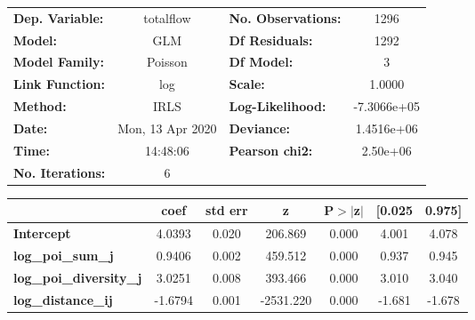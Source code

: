 \begin{center}
\begin{tabular}{lclc}
\toprule
\textbf{Dep. Variable:}         &    totalflow     & \textbf{  No. Observations:  } &      1296    \\
\textbf{Model:}                 &       GLM        & \textbf{  Df Residuals:      } &      1292    \\
\textbf{Model Family:}          &     Poisson      & \textbf{  Df Model:          } &         3    \\
\textbf{Link Function:}         &       log        & \textbf{  Scale:             } &     1.0000   \\
\textbf{Method:}                &       IRLS       & \textbf{  Log-Likelihood:    } & -7.3066e+05  \\
\textbf{Date:}                  & Mon, 13 Apr 2020 & \textbf{  Deviance:          } &  1.4516e+06  \\
\textbf{Time:}                  &     14:48:06     & \textbf{  Pearson chi2:      } &   2.50e+06   \\
\textbf{No. Iterations:}        &        6         & \textbf{                     } &              \\
\bottomrule
\end{tabular}
\begin{tabular}{lcccccc}
                                & \textbf{coef} & \textbf{std err} & \textbf{z} & \textbf{P$> |$z$|$} & \textbf{[0.025} & \textbf{0.975]}  \\
\midrule
\textbf{Intercept}              &       4.0393  &        0.020     &   206.869  &         0.000        &        4.001    &        4.078     \\
\textbf{log\_poi\_sum\_j}       &       0.9406  &        0.002     &   459.512  &         0.000        &        0.937    &        0.945     \\
\textbf{log\_poi\_diversity\_j} &       3.0251  &        0.008     &   393.466  &         0.000        &        3.010    &        3.040     \\
\textbf{log\_distance\_ij}      &      -1.6794  &        0.001     & -2531.220  &         0.000        &       -1.681    &       -1.678     \\
\bottomrule
\end{tabular}
\end{center}
